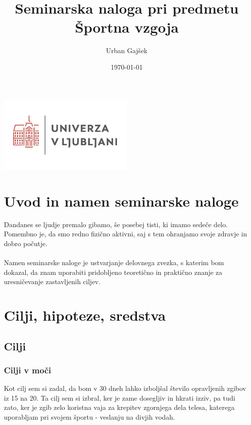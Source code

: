 \documentclass{article}
\begin{document}
\title{Seminarska naloga pri predmetu Športna vzgoja}
\author{Urban Gajšek}
\date{\today}

\maketitle

\begin{center}
    \includegraphics[width=0.5\textwidth]{figures/univerza-v-ljubljani.png}
\end{center}

\newpage
\tableofcontents
\newpage

\section{Uvod in namen seminarske naloge}
Dandanes se ljudje premalo gibamo, še posebej tisti, ki imamo sedeče delo. Pomembno je, da smo redno fizično aktivni, saj s tem ohranjamo svoje zdravje in dobro počutje.
\paragraph{}
Namen seminarske naloge je ustvarjanje delovnega zvezka, s katerim bom dokazal, da znam uporabiti pridobljeno teoretično in praktično znanje za uresničevanje zastavljenih ciljev.

\section{Cilji, hipoteze, sredstva}
\subsection{Cilji}
\subsubsection{Cilji v moči}
Kot cilj sem si zadal, da bom v 30 dneh lahko izboljšal število opravljenih zgibov iz 15 na 20. Ta cilj sem si izbral, ker je zame dosegljiv in hkrati izziv, pa tudi zato, ker je zgib zelo koristna vaja za krepitev zgornjega dela telesa, katerega uporabljam pri svojem športu - veslanju na divjih vodah.
\end{document}
